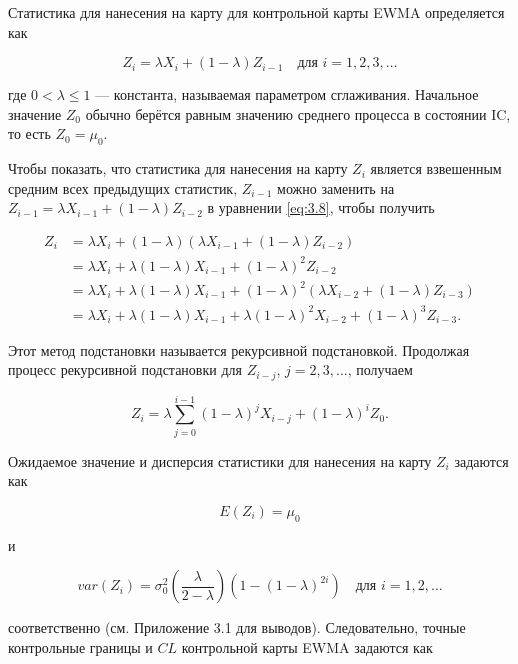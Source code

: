 Статистика для нанесения на карту для контрольной карты EWMA определяется как

\begin{equation}
	Z_i = \lambda X_i + (1 - \lambda)Z_{i-1} \quad \text{для } i = 1, 2, 3, \ldots
	\label{eq:3.8}
\end{equation}

где \(0 < \lambda \leq 1\) — константа, называемая параметром сглаживания. Начальное значение \(Z_0\) обычно берётся равным значению среднего процесса в состоянии IC, то есть \(Z_0 = \mu_0\).

Чтобы показать, что статистика для нанесения на карту \(Z_i\) является взвешенным средним всех предыдущих статистик, \(Z_{i-1}\) можно заменить на \(Z_{i-1} = \lambda X_{i-1} + (1 - \lambda)Z_{i-2}\) в уравнении \eqref{eq:3.8}, чтобы получить

\[
\begin{aligned}
	Z_i &= \lambda X_i + (1 - \lambda)(\lambda X_{i-1} + (1 - \lambda)Z_{i-2}) \\
	&= \lambda X_i + \lambda(1 - \lambda)X_{i-1} + (1 - \lambda)^2 Z_{i-2} \\
	&= \lambda X_i + \lambda(1 - \lambda)X_{i-1} + (1 - \lambda)^2(\lambda X_{i-2} + (1 - \lambda)Z_{i-3}) \\
	&= \lambda X_i + \lambda(1 - \lambda)X_{i-1} + \lambda(1 - \lambda)^2 X_{i-2} + (1 - \lambda)^3 Z_{i-3}.
\end{aligned}
\label{eq:3.8b}
\]

Этот метод подстановки называется рекурсивной подстановкой. Продолжая процесс рекурсивной подстановки для \(Z_{i-j}\), \(j = 2, 3, \ldots\), получаем

\[
Z_i = \lambda \sum_{j=0}^{i-1}(1 - \lambda)^j X_{i-j} + (1 - \lambda)^i Z_0.
\]

Ожидаемое значение и дисперсия статистики для нанесения на карту \(Z_i\) задаются как

\begin{equation}
	E(Z_i) = \mu_0
	\label{eq:3.9}
\end{equation}

и

\begin{equation}
	var(Z_i) = \sigma_0^2\left(\frac{\lambda}{2 - \lambda}\right)(1 - (1 - \lambda)^{2i}) \quad \text{для } i = 1, 2, \ldots
	\label{eq:3.10}
\end{equation}

соответственно (см. Приложение 3.1 для выводов). Следовательно, точные контрольные границы и \(CL\) контрольной карты EWMA задаются как

